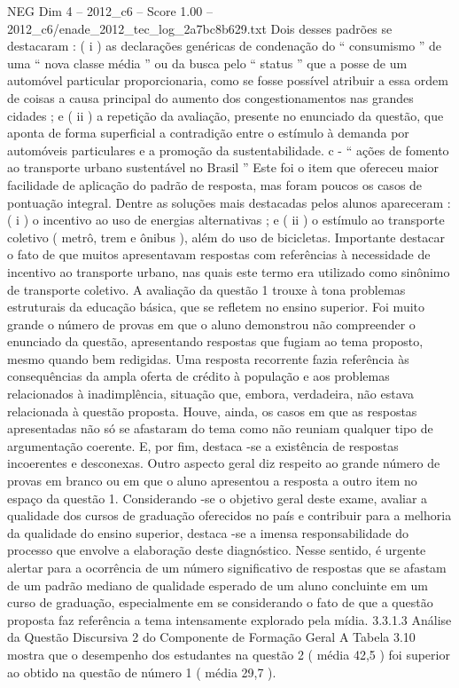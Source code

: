 \begin{textsample}{NEG Dim 4 – 2012\_c6 – Score 1.00 – 2012\_c6/enade\_2012\_tec\_log\_2a7bc8b629.txt}
Dois desses padrões se destacaram : ( i ) as declarações genéricas de condenação do “ consumismo ” de uma “ nova classe média ” ou da busca pelo “ status ” que a posse de um automóvel particular proporcionaria, como se fosse possível atribuir a essa ordem de coisas a causa principal do aumento dos congestionamentos nas grandes cidades ; e ( ii ) a repetição da avaliação, presente no enunciado da questão, que aponta de forma superficial a contradição entre o estímulo à demanda por automóveis particulares e a promoção da sustentabilidade. c - “ ações de fomento ao transporte urbano sustentável no Brasil ” Este foi o item que ofereceu maior facilidade de aplicação do padrão de resposta, mas foram poucos os casos de pontuação integral.
Dentre as soluções mais destacadas pelos alunos apareceram : ( i ) o incentivo ao uso de energias alternativas ; e ( ii ) o estímulo ao transporte coletivo ( metrô, trem e ônibus ), além do uso de bicicletas.
Importante destacar o fato de que muitos apresentavam respostas com referências à necessidade de incentivo ao transporte urbano, nas quais este termo era utilizado como sinônimo de transporte coletivo.
A avaliação da questão 1 trouxe à tona problemas estruturais da educação básica, que se refletem no ensino superior.
Foi muito grande o número de provas em que o aluno demonstrou não compreender o enunciado da questão, apresentando respostas que fugiam ao tema proposto, mesmo quando bem redigidas.
Uma resposta recorrente fazia referência às consequências da ampla oferta de crédito à população e aos problemas relacionados à inadimplência, situação que, embora, verdadeira, não estava relacionada à questão proposta.
Houve, ainda, os casos em que as respostas apresentadas não só se afastaram do tema como não reuniam qualquer tipo de argumentação coerente.
E, por fim, destaca -se a existência de respostas incoerentes e desconexas.
Outro aspecto geral diz respeito ao grande número de provas em branco ou em que o aluno apresentou a resposta a outro item no espaço da questão 1.
Considerando -se o objetivo geral deste exame, avaliar a qualidade dos cursos de graduação oferecidos no país e contribuir para a melhoria da qualidade do ensino superior, destaca -se a imensa responsabilidade do processo que envolve a elaboração deste diagnóstico.
Nesse sentido, é urgente alertar para a ocorrência de um número significativo de respostas que se afastam de um padrão mediano de qualidade esperado de um aluno concluinte em um curso de graduação, especialmente em se considerando o fato de que a questão proposta faz referência a tema intensamente explorado pela mídia. 3.3.1.3 Análise da Questão Discursiva 2 do Componente de Formação Geral A Tabela 3.10 mostra que o desempenho dos estudantes na questão 2 ( média 42,5 ) foi superior ao obtido na questão de número 1 ( média 29,7 ).

\end{textsample}
